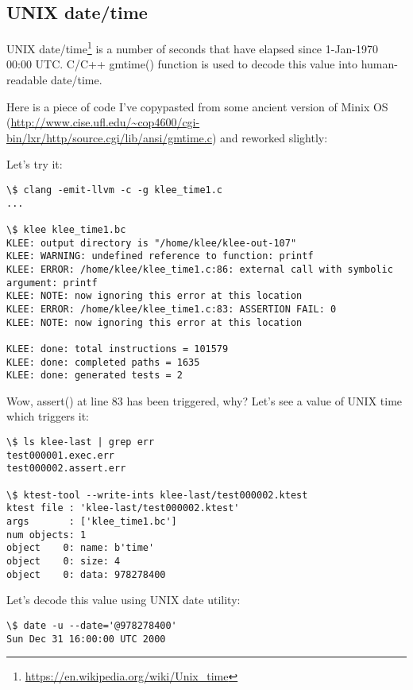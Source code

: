 \subsection{UNIX date/time}

UNIX date/time\footnote{\url{https://en.wikipedia.org/wiki/Unix_time}} is a number of seconds that have elapsed since 1-Jan-1970 00:00 UTC.
C/C++ gmtime() function is used to decode this value into human-readable date/time.

Here is a piece of code I've copypasted from some ancient version of Minix OS 
(\url{http://www.cise.ufl.edu/~cop4600/cgi-bin/lxr/http/source.cgi/lib/ansi/gmtime.c}) and reworked slightly:



Let's try it:

\begin{lstlisting}
\$ clang -emit-llvm -c -g klee_time1.c
...

\$ klee klee_time1.bc
KLEE: output directory is "/home/klee/klee-out-107"
KLEE: WARNING: undefined reference to function: printf
KLEE: ERROR: /home/klee/klee_time1.c:86: external call with symbolic argument: printf
KLEE: NOTE: now ignoring this error at this location
KLEE: ERROR: /home/klee/klee_time1.c:83: ASSERTION FAIL: 0
KLEE: NOTE: now ignoring this error at this location

KLEE: done: total instructions = 101579
KLEE: done: completed paths = 1635
KLEE: done: generated tests = 2
\end{lstlisting}

Wow, assert() at line 83 has been triggered, why?
Let's see a value of UNIX time which triggers it:

\begin{lstlisting}
\$ ls klee-last | grep err
test000001.exec.err
test000002.assert.err

\$ ktest-tool --write-ints klee-last/test000002.ktest
ktest file : 'klee-last/test000002.ktest'
args       : ['klee_time1.bc']
num objects: 1
object    0: name: b'time'
object    0: size: 4
object    0: data: 978278400
\end{lstlisting}

Let's decode this value using UNIX date utility:

\begin{lstlisting}
\$ date -u --date='@978278400'
Sun Dec 31 16:00:00 UTC 2000
\end{lstlisting}

